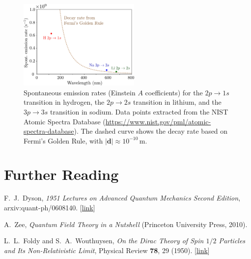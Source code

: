 \documentclass[pra,12pt]{revtex4}
\begin{document}
\begin{figure}[h]
  \centering\includegraphics[width=0.53\textwidth]{emissionrates}
  \caption{Spontaneous emission rates (Einstein $A$ coefficients) for
    the $2p\rightarrow 1s$ transition in hydrogen, the
    $2p\rightarrow2s$ transition in lithium, and the $3p\rightarrow3s$
    transition in sodium.  Data points extracted from the NIST Atomic
    Spectra Database
    (\href{https://www.nist.gov/pml/atomic-spectra-database}{https://www.nist.gov/pml/atomic-spectra-database}).
    The dashed curve shows the decay rate based on Fermi's Golden
    Rule, with $|\mathbf{d}| \approx 10^{-10}\,\mathrm{m}$.  }
\end{figure}




\section*{Further Reading}

\begin{enumerate}[[1{]}]
\item F.~J.~Dyson, \textit{1951 Lectures on Advanced Quantum Mechanics
  Second Edition}, arxiv:quant-ph/0608140. [\href{https://arxiv.org/abs/quant-ph/0608140}{link}]
\label{cite:dyson}

\item A.~Zee, \textit{Quantum Field Theory in a Nutshell} (Princeton
  University Press, 2010).
\label{cite:zee}

\item L.~L.~Foldy and S.~A.~Wouthuysen, \textit{On the Dirac Theory of
  Spin $1/2$ Particles and Its Non-Relativistic Limit}, Physical
  Review \textbf{78}, 29 (1950). [\href{https://journals.aps.org/pr/abstract/10.1103/PhysRev.78.29}{link}]
\label{cite:foldy}
\end{enumerate}
\end{document}
